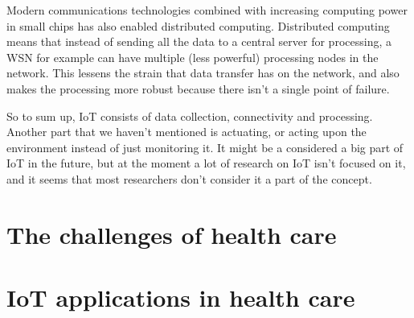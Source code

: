 Modern communications technologies combined with increasing computing power in
small chips has also enabled distributed computing.  Distributed computing
means that instead of sending all the data to a central server for processing,
a WSN for example can have multiple (less powerful) processing nodes in the
network. This lessens the strain that data transfer has on the network, and
also makes the processing more robust because there isn't a single point of
failure.~\cite{Yu2006}

So to sum up, IoT consists of data collection, connectivity and processing.
Another part that we haven't mentioned is actuating, or acting upon the
environment instead of just monitoring it. It might be a considered a big part
of IoT in the future, but at the moment a lot of research on IoT isn't focused
on it, and it seems that most researchers don't consider it a part of the
concept.

\section{The challenges of health care}
\label{sec:health}

\section{IoT applications in health care}
\label{sec:iot-health}
